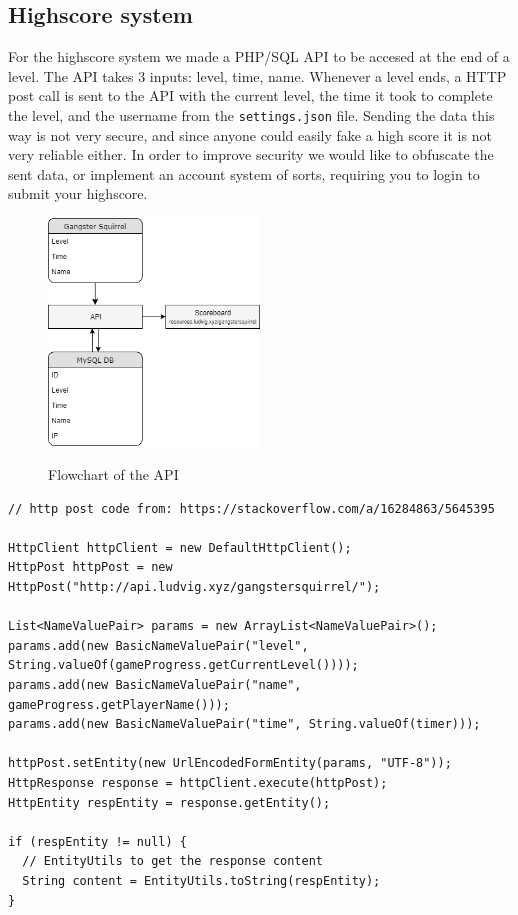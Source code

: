 \documentclass[12p]{article}
\begin{document}

\subsection{Highscore system} \label{Highscore}

For the highscore system we made a PHP/SQL API to be accesed at the end of a level. The API takes 3 inputs: level, time, name. Whenever a level ends, a HTTP post call is sent to the API with the current level, the time it took to complete the level, and the username from the \texttt{settings.json} file. Sending the data this way is not very secure, and since anyone could easily fake a high score it is not very reliable either. In order to improve security we would like to obfuscate the sent data, or implement an account system of sorts, requiring you to login to submit your highscore.

\begin{figure}[ht]
 \center
 \includegraphics[width=0.5\textwidth]{Documentation/gsapi.png}
 \label{fig:highscoresystem}
 \caption{Flowchart of the API}
\end{figure}

\begin{verbatim}
// http post code from: https://stackoverflow.com/a/16284863/5645395

HttpClient httpClient = new DefaultHttpClient();
HttpPost httpPost = new HttpPost("http://api.ludvig.xyz/gangstersquirrel/");

List<NameValuePair> params = new ArrayList<NameValuePair>();
params.add(new BasicNameValuePair("level", String.valueOf(gameProgress.getCurrentLevel())));
params.add(new BasicNameValuePair("name", gameProgress.getPlayerName()));
params.add(new BasicNameValuePair("time", String.valueOf(timer)));

httpPost.setEntity(new UrlEncodedFormEntity(params, "UTF-8"));
HttpResponse response = httpClient.execute(httpPost);
HttpEntity respEntity = response.getEntity();

if (respEntity != null) {
  // EntityUtils to get the response content
  String content = EntityUtils.toString(respEntity);
}
\end{verbatim}
\end{document}
